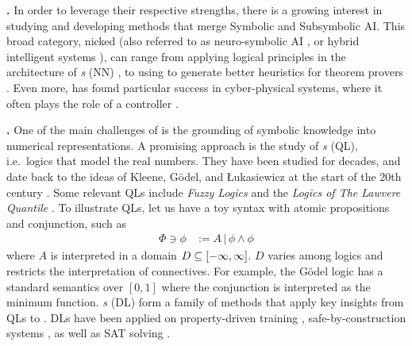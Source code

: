 \textbf{\InAI{}.} In order to leverage their respective strengths, there is a growing interest in studying and developing methods that merge Symbolic and Subsymbolic AI. This broad category, nicked \emph{\InAI{}}  \citep{Platzer_2024} (also referred to as neuro-symbolic AI \citep{d2009neural}, or hybrid intelligent systems \citep{medsker2012hybrid}), can range from applying logical principles in the architecture of \emph{ \NN{}s} (NN)  \citep{badreddine2022logic}, to using \SuAI{} to generate better heuristics for theorem provers \citep{laurent2022learning}. Even more, \InAI{} has found particular success in cyber-physical systems, where it often plays the role of a controller \citep{Platzer_2024}.

\textbf{\DL{}.} One of the main challenges of \InAI{} is the grounding of symbolic knowledge into numerical representations. A promising approach is the study of \emph{\QL{}s} (QL), i.e.~logics that model the real numbers. They have been studied for decades, and date back to the ideas of Kleene, G\"{o}del, and Łukasiewicz at the start of the 20th century \citep{cintula2011handbook, prooffuzzy}. Some relevant QLs include \emph{Fuzzy Logics} \citep{cintula2011handbook} and the \emph{Logics of The Lawvere Quantile} \citep{bacci2023propositional}. To illustrate QLs, let us have a toy syntax with atomic propositions and conjunction, such as
\begin{equation}
\begin{split}
    \Phi \ni \phi &:= A \,|\, \phi \land \phi
\end{split}
\end{equation}
where $A$ is interpreted in a domain $D \subseteq [-\infty,\infty]$. $D$ varies among logics and restricts the interpretation of connectives. For example, the
G\"{o}del logic \citep{BAAZ200723} has a standard semantics over $[0, 1]$ where the conjunction is interpreted as the minimum function. \emph{\DL{}s} (DL) form a family of methods that apply key insights from QLs to \InAI{}. DLs have been applied on property-driven training \citep{FLINKOW2025103280}, safe-by-construction systems \citep{badreddine2022logic}, as well as SAT solving \mcita{}. 

